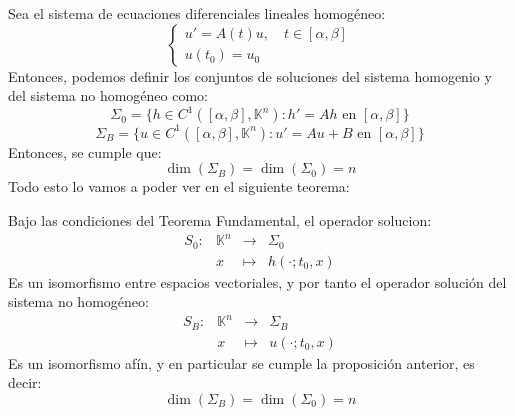 Sea el sistema de ecuaciones diferenciales lineales homogéneo:
\[
    \begin{cases}
        u' = A(t) u, \quad t \in [\alpha, \beta] \\
        u(t_0) = u_0
    \end{cases}
\]
Entonces, podemos definir los conjuntos de soluciones del sistema homogenio y del sistema no homogéneo como:
\[
    \Sigma_0 = \{ h \in C^{1}([\alpha, \beta], \mathbb{K}^n) : h' = Ah \text{ en } [\alpha, \beta] \}
\]
\[
    \Sigma_B = \{ u \in C^{1}([\alpha, \beta], \mathbb{K}^n) : u' = Au + B \text{ en } [\alpha, \beta] \}
\]
Entonces, se cumple que:
\[
    \dim(\Sigma_B) = \dim(\Sigma_0) = n
\]
Todo esto lo vamos a poder ver en el siguiente teorema:

\begin{teorema}
    Bajo las condiciones del Teorema Fundamental, el operador solucion:
    \[
        \begin{array}{rccl}
            S_0 : & \mathbb{K}^n & \to & \Sigma_0 \\
            & x & \mapsto & h(\cdot; t_0, x)
        \end{array}
    \]
    Es un isomorfismo entre espacios vectoriales, y por tanto el operador solución del sistema no homogéneo:
    \[
        \begin{array}{rccl}
            S_B : & \mathbb{K}^n & \to & \Sigma_B \\
            & x & \mapsto & u(\cdot; t_0, x)
        \end{array}
    \]
    Es un isomorfismo afín, y en particular se cumple la proposición anterior, es decir:
    \[
        \dim(\Sigma_B) = \dim(\Sigma_0) = n
    \]
\end{teorema}

